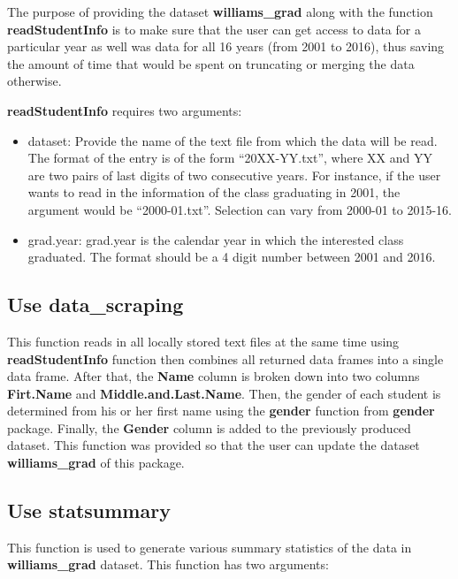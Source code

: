 The purpose of providing the dataset \textbf{williams\_grad} along with
the function \textbf{readStudentInfo} is to make sure that the user can
get access to data for a particular year as well was data for all 16
years (from 2001 to 2016), thus saving the amount of time that would be
spent on truncating or merging the data otherwise.

\textbf{readStudentInfo} requires two arguments:

\begin{itemize}
\item
  dataset: Provide the name of the text file from which the data will be
  read. The format of the entry is of the form ``20XX-YY.txt'', where XX
  and YY are two pairs of last digits of two consecutive years. For
  instance, if the user wants to read in the information of the class
  graduating in 2001, the argument would be ``2000-01.txt''. Selection
  can vary from 2000-01 to 2015-16.
\item
  grad.year: grad.year is the calendar year in which the interested
  class graduated. The format should be a 4 digit number between 2001
  and 2016.
\end{itemize}

\subsection{Use data\_scraping}\label{use-dataux5fscraping}

This function reads in all locally stored text files at the same time
using \textbf{readStudentInfo} function then combines all returned data
frames into a single data frame. After that, the \textbf{Name} column is
broken down into two columns \textbf{Firt.Name} and
\textbf{Middle.and.Last.Name}. Then, the gender of each student is
determined from his or her first name using the \textbf{gender} function
from \textbf{gender} package. Finally, the \textbf{Gender} column is
added to the previously produced dataset. This function was provided so
that the user can update the dataset \textbf{williams\_grad} of this
package.

\newpage

\subsection{Use statsummary}\label{use-statsummary}

This function is used to generate various summary statistics of the data
in \textbf{williams\_grad} dataset. This function has two arguments:

